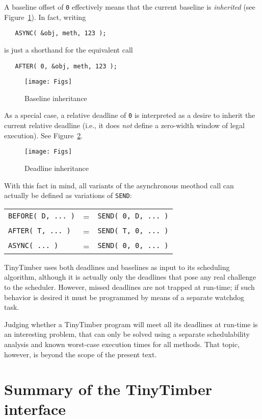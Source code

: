 \documentclass[12pt]{article}
\begin{document}
A baseline offset of {\tt 0} effectively means that the current baseline is {\em inherited} (see Figure~\ref{fig:async}).  In fact, writing
\begin{verbatim}
   ASYNC( &obj, meth, 123 );
\end{verbatim}
is just a shorthand for the equivalent call
\begin{verbatim}
   AFTER( 0, &obj, meth, 123 );
\end{verbatim}
\begin{figure}
\texttt{[image: Figs]}
\caption{\label{fig:async}Baseline inheritance}
\end{figure}
As a special case, a relative deadline of {\tt 0} is interpreted as a desire to inherit the current relative deadline (i.e., it does {\em not} define a zero-width window of legal execution). See Figure~\ref{fig:inheritance}.
\begin{figure}
\texttt{[image: Figs]}
\caption{\label{fig:inheritance}Deadline inheritance}
\end{figure}

With this fact in mind, all variants of the asynchronous meothod call can actually be defined as variations of {\tt SEND}:
\begin{center}
\begin{tabular}{lll}
    {\tt BEFORE( D, ... )} & = & {\tt SEND( 0, D, ... )} \\
    {\tt AFTER( T, ... )}  & = & {\tt SEND( T, 0, ... )} \\
    {\tt ASYNC( ... )}     & = & {\tt SEND( 0, 0, ... )}
\end{tabular}
\end{center}


TinyTimber uses both deadlines and baselines as input to its scheduling algorithm, although it is actually only the deadlines that pose any real challenge to the scheduler.  However, missed deadlines are not trapped at run-time; if such behavior is desired it must be programmed by means of a separate watchdog task.  

Judging whether a TinyTimber program will meet all its deadlines at run-time is an interesting problem, that can only be solved using a separate schedulability analysis and known worst-case execution times for all methods.  That topic, however, is beyond the scope of the present text.


\section{Summary of the TinyTimber interface}
\end{document}
